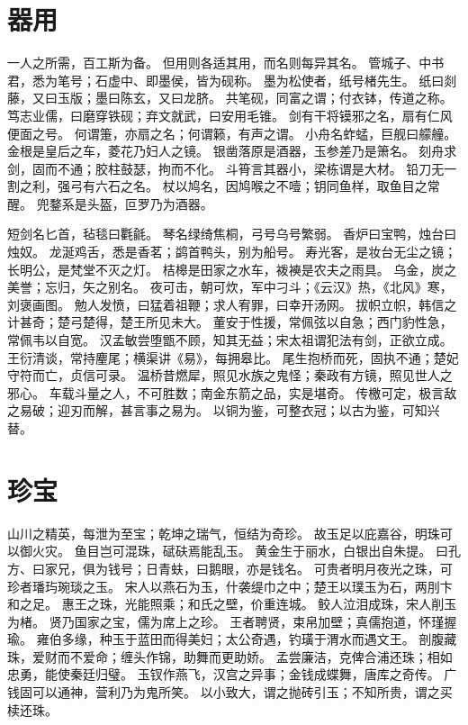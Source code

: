 \documentclass[12pt,UTF8]{ctexbook}
\begin{document}
\chapter{器用}

一人之所需，百工斯为备。
但用则各适其用，而名则每异其名。
管城子、中书君，悉为笔号；石虚中、即墨侯，皆为砚称。
墨为松使者，纸号楮先生。
纸曰剡藤，又曰玉版；墨曰陈玄，又曰龙脐。
共笔砚，同富之谓；付衣钵，传道之称。
笃志业儒，曰磨穿铁砚；弃文就武，曰安用毛锥。
剑有干将镆邪之名，扇有仁风便面之号。
何谓箑，亦扇之名；何谓籁，有声之谓。
小舟名蚱蜢，巨舰曰艨艟。
金根是皇后之车，菱花乃妇人之镜。
银凿落原是酒器，玉参差乃是箫名。
刻舟求剑，固而不通；胶柱鼓瑟，拘而不化。
斗筲言其器小，梁栋谓是大材。
铅刀无一割之利，强弓有六石之名。
杖以鸠名，因鸠喉之不噎；钥同鱼样，取鱼目之常醒。
兜鍪系是头盔，叵罗乃为酒器。

短剑名匕首，毡毯曰氍毹。
琴名绿绮焦桐，弓号乌号繁弱。
香炉曰宝鸭，烛台曰烛奴。
龙涎鸡舌，悉是香茗；鹢首鸭头，别为船号。
寿光客，是妆台无尘之镜；长明公，是梵堂不灭之灯。
桔槔是田家之水车，袯襫是农夫之雨具。
乌金，炭之美誉；忘归，矢之别名。
夜可击，朝可炊，军中刁斗；《云汉》热，《北风》寒，刘褒画图。
勉人发愤，曰猛着祖鞭；求人宥罪，曰幸开汤网。
拔帜立帜，韩信之计甚奇；楚弓楚得，楚王所见未大。
董安于性援，常佩弦以自急；西门豹性急，常佩韦以自宽。
汉孟敏尝堕甑不顾，知其无益；宋太祖谓犯法有剑，正欲立成。
王衍清谈，常持麈尾；横渠讲《易》，每拥皋比。
尾生抱桥而死，固执不通；楚妃守符而亡，贞信可录。
温桥昔燃犀，照见水族之鬼怪；秦政有方镜，照见世人之邪心。
车载斗量之人，不可胜数；南金东箭之品，实是堪奇。
传檄可定，极言敌之易破；迎刃而解，甚言事之易为。
以铜为鉴，可整衣冠；以古为鉴，可知兴替。

\chapter{珍宝}

山川之精英，每泄为至宝；乾坤之瑞气，恒结为奇珍。
故玉足以庇嘉谷，明珠可以御火灾。
鱼目岂可混珠，碔砆焉能乱玉。
黄金生于丽水，白银出自朱提。
曰孔方、曰家兄，俱为钱号；日青蚨，曰鹅眼，亦是钱名。
可贵者明月夜光之珠，可珍者璠玙琬琰之玉。
宋人以燕石为玉，什袭缇巾之中；楚王以璞玉为石，两刖卞和之足。
惠王之珠，光能照乘；和氏之壁，价重连城。
鲛人泣泪成珠，宋人削玉为楮。
贤乃国家之宝，儒为席上之珍。
王者聘贤，束帛加壁；真儒抱道，怀瑾握瑜。
雍伯多缘，种玉于蓝田而得美妇；太公奇遇，钓璜于渭水而遇文王。
剖腹藏珠，爱财而不爱命；缠头作锦，助舞而更助娇。
孟尝廉洁，克俾合浦还珠；相如忠勇，能使秦廷归璧。
玉钗作燕飞，汉宫之异事；金钱成蝶舞，唐库之奇传。
广钱固可以通神，营利乃为鬼所笑。
以小致大，谓之抛砖引玉；不知所贵，谓之买椟还珠。
\end{document}
